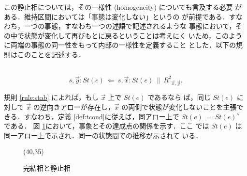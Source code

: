 この静止相については，その一様性 (homogeneity) についても言及する必要
がある．維持区間においては「事態は変化しない」というの
が前提である．すなわち，一つの事態，すなわち一つの述語で記述されるような
事態において，その中で状態が変化して再びもとに戻るということは考えにく
いため，このように両端の事態の同一性をもって内部の一様性を定義すること
とした．以下の規則はこのことを記述する．
\begin{my-rule}[一様性]\label{rule:stab}~
\[ s,{\vec y}\colon St(e) ~\Leftarrow ~s,{\vec x}\colon
St(e) ~\|~{R^{2}}_{{\vec x},{\vec y}}.\]
\end{my-rule}
規則 \ref{rule:stab} によれば，もし $\vec x$ 上で $St(e)$ であるなら
ば，同じ $St(e)$ に対して $\vec x$ の逆向きアローが存在し，$\vec x$ 
の両側で状態が変化しないことを主張できる．すなわち，定義
 \ref{def:tcond}に従えば，同アロー上で $St(e) ~=~St(e)^{\vee}$ である． 
図 \ref{fig:eventstate}において，事象とその達成点の関係を示す．ここ
では $St(e)$ は同一アロー上で示され．同一の状態間での推移が示されて
いる．

\begin{figure}[htbp]
\atari(40,35)
\caption{完結相と静止相}\label{fig:eventstate}
\end{figure}

